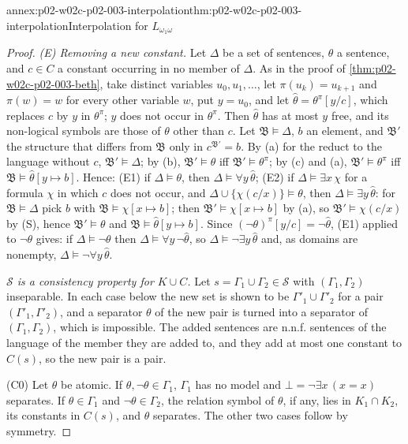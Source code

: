 \begin{annexitem}{annex:p02-w02c-p02-003-interpolation}{thm:p02-w02c-p02-003-interpolation}{Interpolation for \(L_{\omega_1\omega}\)}
\begin{proof}
\emph{(E) Removing a new constant.}  Let \(\Delta\) be a set of sentences,
\(\theta\) a sentence, and \(c\in C\) a constant occurring in no member of
\(\Delta\).  As in the proof of \cref{thm:p02-w02c-p02-003-beth}, take
distinct variables \(u_0,u_1,\ldots\), let \(\pi(u_k)=u_{k+1}\) and
\(\pi(w)=w\) for every other variable \(w\), put \(y=u_0\), and let
\(\hat\theta=\theta^{\pi}[y/c]\), which replaces \(c\) by \(y\) in
\(\theta^{\pi}\); \(y\) does not occur in \(\theta^{\pi}\).  Then
\(\hat\theta\) has at most \(y\) free, and its non-logical symbols are
those of \(\theta\) other than \(c\).  Let \(\mathfrak B\models\Delta\),
\(b\) an element, and \(\mathfrak B'\) the structure that differs from
\(\mathfrak B\) only in \(c^{\mathfrak B'}=b\).  By (a) for the reduct to
the language without \(c\), \(\mathfrak B'\models\Delta\); by (b),
\(\mathfrak B'\models\theta\) iff \(\mathfrak B'\models\theta^{\pi}\);
by (c) and (a), \(\mathfrak B'\models\theta^{\pi}\) iff
\(\mathfrak B\models\hat\theta[y\mapsto b]\).  Hence:
(E1) if \(\Delta\models\theta\), then \(\Delta\models\forall y\,\hat\theta\);
(E2) if \(\Delta\models\exists x\,\chi\) for a formula \(\chi\) in which
\(c\) does not occur, and \(\Delta\cup\{\chi(c/x)\}\models\theta\), then
\(\Delta\models\exists y\,\hat\theta\): for \(\mathfrak B\models\Delta\)
pick \(b\) with \(\mathfrak B\models\chi[x\mapsto b]\); then
\(\mathfrak B'\models\chi[x\mapsto b]\) by (a), so
\(\mathfrak B'\models\chi(c/x)\) by (S), hence \(\mathfrak B'\models\theta\)
and \(\mathfrak B\models\hat\theta[y\mapsto b]\).  Since
\((\neg\theta)^{\pi}[y/c]=\neg\hat\theta\), (E1) applied to \(\neg\theta\)
gives: if \(\Delta\models\neg\theta\) then \(\Delta\models\forall
y\,\neg\hat\theta\), so \(\Delta\models\neg\exists y\,\hat\theta\) and, as
domains are nonempty, \(\Delta\models\neg\forall y\,\hat\theta\).

\emph{\(\mathcal S\) is a consistency property for \(K\cup C\).}  Let
\(s=\Gamma_1\cup\Gamma_2\in\mathcal S\) with \((\Gamma_1,\Gamma_2)\)
inseparable.  In each case below the new set is shown to be
\(\Gamma'_1\cup\Gamma'_2\) for a pair \((\Gamma'_1,\Gamma'_2)\), and a
separator \(\theta\) of the new pair is turned into a separator of
\((\Gamma_1,\Gamma_2)\), which is impossible.  The added sentences are
n.n.f. sentences of the language of the member they are added to, and they
add at most one constant to \(C(s)\), so the new pair is a pair.

(C0) Let \(\theta\) be atomic.  If \(\theta,\neg\theta\in\Gamma_1\),
\(\Gamma_1\) has no model and \(\bot=\neg\exists x\,(x=x)\) separates.  If
\(\theta\in\Gamma_1\) and \(\neg\theta\in\Gamma_2\), the relation symbol of
\(\theta\), if any, lies in \(K_1\cap K_2\), its constants in \(C(s)\), and
\(\theta\) separates.  The other two cases follow by symmetry.


\end{proof}
\end{annexitem}

